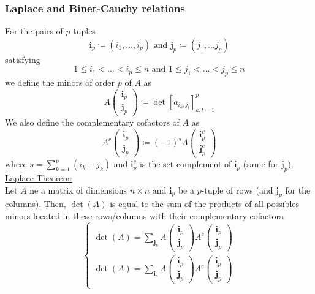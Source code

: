 \documentclass[12pt, openany]{report}
\theoremstyle{definition}
\begin{document}
\subsubsection{Laplace and Binet-Cauchy relations}
For the pairs of \(p\)-tuples \[\textbf{i}_p \coloneqq (i_1,\dots,i_p)\text{ and }\textbf{j}_p\coloneqq (j_1,\dots j_p)\] satisfying \[1\le i_1<\dots<i_p\le n\text{ and } 1\le j_1<\dots<j_p\le n\] we define the minors of order \(p\) of \(A\) as 
\begin{equation}
    A\begin{pmatrix}
        \textbf{i}_p\\ \textbf{j}_p
    \end{pmatrix} \coloneqq \det[a_{i_k,j_l}]_{k,l=1}^p
\end{equation}
We also define the complementary cofactors of \(A\) as 
\begin{equation}
    A^c\begin{pmatrix}
        \textbf{i}_p\\ \textbf{j}_p
    \end{pmatrix} \coloneqq (-1)^s A\begin{pmatrix}
        \textbf{i}_p^c\\ \textbf{j}_p^c
    \end{pmatrix}
\end{equation}
where \(s = \sum_{k=1}^p(i_k+j_k)\) and \(\textbf{i}_p^c\) is the set complement of \(\textbf{i}_p\) (same for \(\textbf{j}_p\)). \\
\underline{Laplace Theorem:}\\
Let \(A\) ne a matrix of dimensions \(n\times n\) and \(\textbf{i}_p\) be a \(p\)-tuple of rows (and \(\textbf{j}_p\) for the columns). Then, \(\det(A)\) is equal to the sum of the products of all possibles minors located in these rows/columns with their complementary cofactors:
\begin{equation}
    \begin{cases}
        \det(A) = \sum_{\textbf{j}_p}A\begin{pmatrix}
            \textbf{i}_p\\\textbf{j}_p
        \end{pmatrix} A^c\begin{pmatrix}
            \textbf{i}_p\\\textbf{j}_p
        \end{pmatrix}\\
        \det(A) = \sum_{\textbf{i}_p}A\begin{pmatrix}
            \textbf{i}_p\\\textbf{j}_p
        \end{pmatrix} A^c\begin{pmatrix}
            \textbf{i}_p\\\textbf{j}_p
        \end{pmatrix}\\
    \end{cases}
\end{equation}
\end{document}
